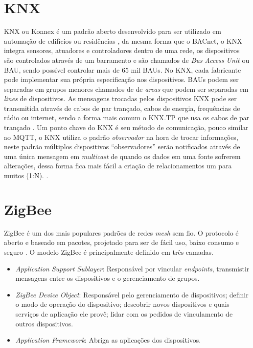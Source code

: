 \section{KNX}
KNX ou Konnex é um padrão aberto desenvolvido para ser utilizado em automação de edifícios ou residências \cite{Sapundzhi2020}, da mesma forma que o BACnet, o KNX integra sensores, atuadores e controladores dentro de uma rede, os dispositivos são controlados através de um barramento e são chamados de \emph{Bus Access Unit} ou BAU, sendo possível controlar mais de 65 mil BAUs. No KNX, cada fabricante pode implementar sua própria especificação nos dispositivos. BAUs podem ser separadas em grupos menores chamados de de \emph{areas} que podem ser separadas em \emph{lines} de dispositivos. As mensagens trocadas pelos dispositivos KNX pode ser transmitida através de cabos de par trançado, cabos de energia, frequências de rádio ou internet, sendo a forma mais comum o KNX.TP que usa os cabos de par trançado \cite{Kraus2020}.
Um ponto chave do KNX é seu método de comunicação, pouco similar ao MQTT, o KNX utiliza o padrão \emph{observador} na hora de trocar informações, neste padrão múltiplos dispositivos ``observadores'' serão notificados através de uma única mensagem em \emph{multicast} de quando os dados em uma fonte sofrerem alterações, dessa forma fica mais fácil a criação de relacionamentos um para muitos (1:N). \cite{Domingues2016}. 

\section{ZigBee}
ZigBee é um dos mais populares padrões de redes \emph{mesh} sem fio. O protocolo é aberto e baseado em pacotes, projetado para ser de fácil uso, baixo consumo e seguro \cite{tomar2011}.
O modelo ZigBee é principalmente definido em três camadas.
\begin{itemize}
    \item \emph{Application Support Sublayer}: Responsável por vincular \emph{endpoints}, transmistir mensagens entre os dispositivos e o gerenciamento de grupos.
    \item \emph{ZigBee Device Object}: Responsável pelo gerenciamento de dispositivos; definir o modo de operação do dispositivo; descobrir novos dispositivos e quais serviços de aplicação ele provê; lidar com os pedidos de vinculamento de outros dispositivos.
    \item \emph{Application Framework}: Abriga as aplicações dos dispositivos. 
\end{itemize}
\cite{Domingues2016}

